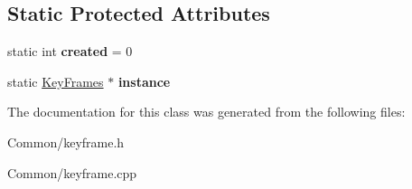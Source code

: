 \subsection*{\-Static \-Protected \-Attributes}
\begin{DoxyCompactItemize}
\item 
\hypertarget{class_key_frames_aed983376b5d2e13a4c1eddf3045c9265}{
static int {\bfseries created} = 0}
\label{class_key_frames_aed983376b5d2e13a4c1eddf3045c9265}

\item 
\hypertarget{class_key_frames_a6cc8cb2356ae98be13afdd3e2c539306}{
static \hyperlink{class_key_frames}{\-Key\-Frames} $\ast$ {\bfseries instance}}
\label{class_key_frames_a6cc8cb2356ae98be13afdd3e2c539306}

\end{DoxyCompactItemize}


\-The documentation for this class was generated from the following files\-:\begin{DoxyCompactItemize}
\item 
\-Common/keyframe.\-h\item 
\-Common/keyframe.\-cpp\end{DoxyCompactItemize}

